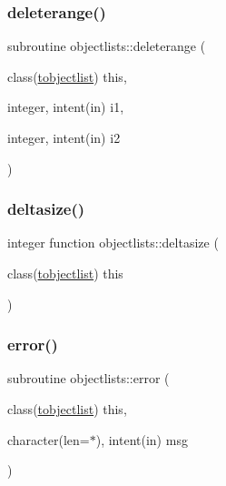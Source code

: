 \mbox{\label{namespaceobjectlists_ac82708b7b56f4fca7c7e55d43a84ad84}} 
\subsubsection{\texorpdfstring{deleterange()}{deleterange()}}
{\footnotesize\ttfamily subroutine objectlists\+::deleterange (\begin{DoxyParamCaption}\item[{class(\mbox{\hyperlink{structobjectlists_1_1tobjectlist}{tobjectlist}})}]{this,  }\item[{integer, intent(in)}]{i1,  }\item[{integer, intent(in)}]{i2 }\end{DoxyParamCaption})\hspace{0.3cm}{\ttfamily [private]}}

\mbox{\label{namespaceobjectlists_a302ff79b4cac76b93d93d5ab7ea9abc4}} 
\subsubsection{\texorpdfstring{deltasize()}{deltasize()}}
{\footnotesize\ttfamily integer function objectlists\+::deltasize (\begin{DoxyParamCaption}\item[{class(\mbox{\hyperlink{structobjectlists_1_1tobjectlist}{tobjectlist}})}]{this }\end{DoxyParamCaption})\hspace{0.3cm}{\ttfamily [private]}}

\mbox{\label{namespaceobjectlists_a36abcb049579dcfaee4f3d38cf09b5d1}} 
\subsubsection{\texorpdfstring{error()}{error()}}
{\footnotesize\ttfamily subroutine objectlists\+::error (\begin{DoxyParamCaption}\item[{class(\mbox{\hyperlink{structobjectlists_1_1tobjectlist}{tobjectlist}})}]{this,  }\item[{character(len=$\ast$), intent(in)}]{msg }\end{DoxyParamCaption})\hspace{0.3cm}{\ttfamily [private]}}



